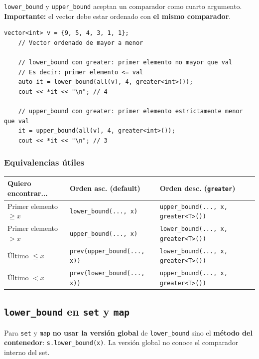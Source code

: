 \texttt{lower\_bound} y \texttt{upper\_bound} aceptan un comparador como cuarto argumento.
\textbf{Importante:} el vector debe estar ordenado con \textbf{el mismo comparador}.

\begin{lstlisting}[style=cppstyle, caption={lower\_bound con greater (vector de mayor a menor)}]
    vector<int> v = {9, 5, 4, 3, 1, 1};
    // Vector ordenado de mayor a menor

    // lower_bound con greater: primer elemento no mayor que val
    // Es decir: primer elemento <= val
    auto it = lower_bound(all(v), 4, greater<int>());
    cout << *it << "\n"; // 4

    // upper_bound con greater: primer elemento estrictamente menor que val
    it = upper_bound(all(v), 4, greater<int>());
    cout << *it << "\n"; // 3
\end{lstlisting}

\subsubsection{Equivalencias útiles}

\begin{center}
\begin{tabular}{l|l|l}
    \textbf{Quiero encontrar...} & \textbf{Orden asc. (default)} & \textbf{Orden desc. (\texttt{greater})} \\
    \hline
    Primer elemento $\geq x$ & \texttt{lower\_bound(..., x)} & \texttt{upper\_bound(..., x, greater<T>())} \\
    Primer elemento $> x$    & \texttt{upper\_bound(..., x)} & \texttt{lower\_bound(..., x, greater<T>())} \\
    Último $\leq x$ & \texttt{prev(upper\_bound(..., x))} & \texttt{lower\_bound(..., x, greater<T>())} \\
    Último $< x$    & \texttt{prev(lower\_bound(..., x))} & \texttt{upper\_bound(..., x, greater<T>())} \\
\end{tabular}
\end{center}

\subsection{\texttt{lower\_bound} en \texttt{set} y \texttt{map}}

Para \texttt{set} y \texttt{map} \textbf{no usar la versión global} de \texttt{lower\_bound} sino el \textbf{método del contenedor}: \texttt{s.lower\_bound(x)}. La versión global no conoce el comparador interno del set.


